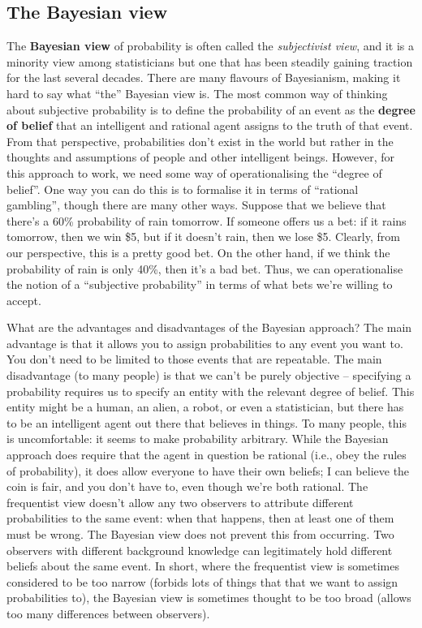 \documentclass[
]{book}
\theoremstyle{definition}
\theoremstyle{definition}
\theoremstyle{definition}
\theoremstyle{definition}
\theoremstyle{remark}
\begin{document}
\hypertarget{the-bayesian-view}{%
\subsection{The Bayesian view}\label{the-bayesian-view}}

The \textbf{Bayesian view} of probability is often called the \emph{subjectivist view}, and it is a minority view among statisticians but one that has been steadily gaining traction for the last several decades. There are many flavours of Bayesianism, making it hard to say what ``the'' Bayesian view is. The most common way of thinking about subjective probability is to define the probability of an event as the \textbf{degree of belief} that an intelligent and rational agent assigns to the truth of that event. From that perspective, probabilities don't exist in the world but rather in the thoughts and assumptions of people and other intelligent beings.
However, for this approach to work, we need some way of operationalising the ``degree of belief''. One way you can do this is to formalise it in terms of ``rational gambling'', though there are many other ways. Suppose that we believe that there's a 60\% probability of rain tomorrow. If someone offers us a bet: if it rains tomorrow, then we win \$5, but if it doesn't rain, then we lose \$5. Clearly, from our perspective, this is a pretty good bet. On the other hand, if we think the probability of rain is only 40\%, then it's a bad bet. Thus, we can operationalise the notion of a ``subjective probability'' in terms of what bets we're willing to accept.

What are the advantages and disadvantages of the Bayesian approach? The main advantage is that it allows you to assign probabilities to any event you want to. You don't need to be limited to those events that are repeatable. The main disadvantage (to many people) is that we can't be purely objective -- specifying a probability requires us to specify an entity with the relevant degree of belief. This entity might be a human, an alien, a robot, or even a statistician, but there has to be an intelligent agent out there that believes in things. To many people, this is uncomfortable: it seems to make probability arbitrary. While the Bayesian approach does require that the agent in question be rational (i.e., obey the rules of probability), it does allow everyone to have their own beliefs; I can believe the coin is fair, and you don't have to, even though we're both rational. The frequentist view doesn't allow any two observers to attribute different probabilities to the same event: when that happens, then at least one of them must be wrong. The Bayesian view does not prevent this from occurring. Two observers with different background knowledge can legitimately hold different beliefs about the same event. In short, where the frequentist view is sometimes considered to be too narrow (forbids lots of things that that we want to assign probabilities to), the Bayesian view is sometimes thought to be too broad (allows too many differences between observers).
\end{document}
